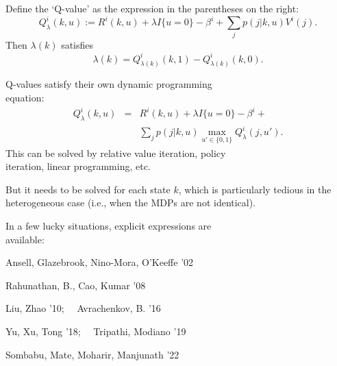 \documentclass{slides}
\begin{document}
{Define the `Q-value' as the expression in the parentheses on the right:
$$Q_\lambda^i(k,u) := R^i(k,u) + \lambda I\{u=0\} - \beta^i + \sum_jp(j|k,u)V^i(j).$$
Then $\lambda(k)$ satisfies
$$ \lambda(k) = Q_{\lambda(k)}^i(k,1) - Q_{\lambda(k)}^i(k,0).$$

\newpage

Q-values satisfy their own dynamic programming\\ equation:
\begin{eqnarray*}
Q_\lambda^i(k,u) &=& R^i(k,u) + \lambda I\{u=0\} - \beta^i + \\
&& \sum_jp(j|k,u)\max_{u'\in\{0,1\}}Q_\lambda^i(j,u').
\end{eqnarray*}
This can be solved by relative value iteration, policy\\ iteration, linear programming, etc.

But it needs to be solved for {\color{red} each state $k$}, which is particularly tedious in the heterogeneous case (i.e., when the MDPs are not identical).

\newpage

In a few lucky situations, explicit expressions are\\ available:

Ansell, Glazebrook, Nino-Mora, O'Keeffe '02 

Rahunathan, B., Cao, Kumar '08

Liu, Zhao '10;  \ \ 
Avrachenkov, B. '16 

Yu, Xu, Tong '18; \ \ 
Tripathi, Modiano '19  

Sombabu, Mate, Moharir, Manjunath '22
}
\end{document}
